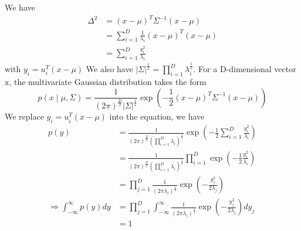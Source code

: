 \documentclass{article}
\begin{document}
We have
$$
\begin{aligned}
\Delta^{2} &=(x-\mu)^{T} \Sigma^{-1}(x-\mu) \\
&=\sum_{i=1}^{D} \frac{1}{\lambda_{i}}(x-\mu)^{T}(x-\mu) \\
&=\sum_{i=1}^{D} \frac{y_{i}^{2}}{\lambda_{i}}
\end{aligned}
$$
with $y_{i}=u_{i}^{T}(x-\mu)$ We also have $|\Sigma|^{\frac{1}{2}}=\prod_{i=1}^{D} \lambda_{i}^{\frac{1}{2}}$.
For a D-dimensional vector $\mathrm{x}$, the multivariate Gaussian distribution takes the form
\[p(x \mid \mu, \Sigma)=\frac{1}{(2 \pi)^{\frac{D}{2}}|\Sigma|^{\frac{1}{2}}} \exp \left(-\frac{1}{2}(x-\mu)^{T} \Sigma^{-1}(x-\mu)\right)\]
We replace $y_{i}=u_{i}^{T}(x-\mu)$ into the equation, we have
$$
\begin{aligned}
p(y) &=\frac{1}{(2 \pi)^{\frac{D}{2}}\left(\prod_{i=1}^{D} \lambda_{i}\right)^{\frac{1}{2}}} \exp \left(-\frac{1}{2} \sum_{i=1}^{D} \frac{y_{i}^{2}}{\lambda_{i}}\right) \\
&=\frac{1}{(2 \pi)^{\frac{D}{2}}\left(\prod_{i=1}^{D} \lambda_{i}\right)^{\frac{1}{2}}} \prod_{i=1}^{D} \exp \left(-\frac{1}{2} \frac{y_{i}^{2}}{\lambda_{i}}\right) \\
&=\prod_{j=1}^{D} \frac{1}{\left(2 \pi \lambda_{i}\right)^{\frac{1}{2}}} \exp \left(-\frac{y_{j}^{2}}{2 \lambda_{j}}\right) \\
\Longrightarrow \int_{-\infty}^{\infty} p(y) d y &=\prod_{j=1}^{D} \int_{-\infty}^{\infty} \frac{1}{\left(2 \pi \lambda_{i}\right)^{\frac{1}{2}}} \exp \left(-\frac{y_{j}^{2}}{2 \lambda_{j}}\right) d y_{j} \\
&=1
\end{aligned}
$$
\end{document}
